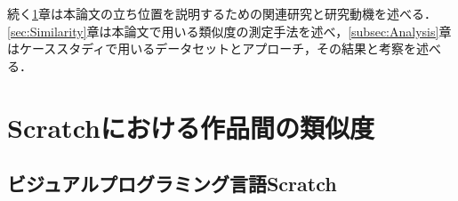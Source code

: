\documentclass[T,J]{fose} %
\begin{document}
続く\ref{sec:RelatedWork}章は本論文の立ち位置を説明するための関連研究と研究動機を述べる．\ref{sec:Similarity}章は本論文で用いる類似度の測定手法を述べ，\ref{subsec:Analysis}章はケーススタディで用いるデータセットとアプローチ，その結果と考察を述べる．

\section{Scratchにおける作品間の類似度}\label{sec:RelatedWork}

\subsection{ビジュアルプログラミング言語Scratch}\label{subsec:Scratch}
\end{document}
